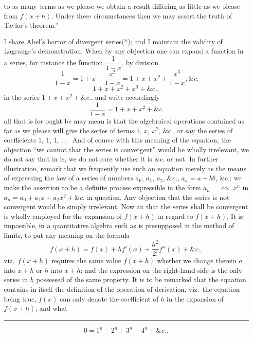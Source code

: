 \documentclass[11pt,a4paper]{article}
\theoremstyle{plain}
\theoremstyle{definition}
\begin{document}
\noindent
to as many terms as we please we obtain a result differing as little as we please
from $f(x + h)$. Under these circumstances then we may assert the truth of Taylor's
theorem.''

I share Abel's horror of divergent series(*); and I maintain the validity of Lagrange's
demonstration. When by any objection one can expand a function in a series, for
instance the function $\dfrac{1}{1-x}$, by division
\[
\dfrac{1}{1-x}=1+x+\dfrac{x^2}{1-x}=1+x+x^2+\dfrac{x^3}{1-x},\&c.
\]
\[
1 + x + x^2 + x^3 + \&c.,
\]
in the series $1 + x + x^2 + \&c.$, and write accordingly
\[
\frac{1}{1 - x} = 1 + x + x^2 + \&c.
\]
all that is for ought be may mean is that the algebraical operations contained as far
as we please will give the series of terms $1$, $x$, $x^2$, $\&c.$, or say the series of coefficients
$1$, $1$, $1$, ... \, And of course with this meaning of the equation, the objection ``we cannot
that the series is convergent'' would be wholly irrelevant, we do not say that
in is, we do not care whether it is $\&c.$ or not. In further illustration, remark that
we frequently use such an equation merely as the means of expressing the law of a
series of numbers $a_0$, $a_1$, $a_2$, $\&c.$, $a_n = a + b\theta$, $\&c.$; we make the assertion
to be a definite process expressible in the form $a_n = $ co.\ $x^n$ in $a_n = a_0 + a_1 x + a_2 x^2 + \&c.$ in question.
Any objection that the series is not convergent would be simply irrelevant. Now an
that the series shall be convergent is wholly employed for the expansion of $f(x + h)$
in regard to $f(x + h)$. It is impossible, in a quantitative algebra such as is presupposed
in the method of limits, to put any meaning on the formula
\[
f(x + h) = f(x) + hf'(x) + \frac{h^2}{2!}f''(x) + \&c.,
\]
viz.\ $f(x + h)$ requires the same value $f(x + h)$ whether we change therein $a$ into
$x + h$ or $h$ into $x + h$; and the expression on the right-hand side is the only series
in $h$ possessed of the same property. It is to be remarked that the equation contains
in itself the definition of the operation of derivation, viz.\ the equation being true,
$f(x)$ can only denote the coefficient of $h$ in the expansion of $f(x + h)$, and what

\smallskip
\noindent\rule{0.45\textwidth}{0.4pt}
\[
0 = 1^n - 2^n + 3^n - 4^n + \&c.,
\]
\end{document}
